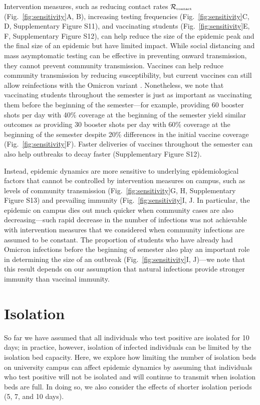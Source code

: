 \documentclass[12pt]{article}
\newcommand{\fref}[1]{Fig.~\ref{fig:#1}}
\newcommand{\Rx}[1]{\ensuremath{{\mathcal R}_{#1}}}
\newcommand{\Rc}{\Rx{\textrm{\tiny{contact}}}}
\begin{document}
Intervention measures, such as reducing contact rates $\Rc$ (\fref{sensitivity}A, B), increasing testing frequencies (\fref{sensitivity}C, D, Supplementary Figure S11), and vaccinating students (\fref{sensitivity}E, F, Supplementary Figure S12), can help reduce the size of the epidemic peak and the final size of an epidemic but have limited impact.
While social distancing and mass asymptomatic testing can be effective in preventing onward transmission, they cannot prevent community transmission.
Vaccines can help reduce community transmission by reducing susceptibility, but current vaccines can still allow reinfections with the Omicron variant \citep{ferguson2021report}.
Nonetheless, we note that vaccinating students throughout the semester is just as important as vaccinating them before the beginning of the semester---for example, providing 60 booster shots per day with 40\% coverage at the beginning of the semester yield similar outcomes as providing 30 booster shots per day with 60\% coverage at the beginning of the semester despite 20\% differences in the initial vaccine coverage (\fref{sensitivity}F).
Faster deliveries of vaccines throughout the semester can also help outbreaks to decay faster (Supplementary Figure S12).

Instead, epidemic dynamics are more sensitive to underlying epidemiological factors that cannot be controlled by intervention measures on campus, such as levels of community transmission (\fref{sensitivity}G, H, Supplementary Figure S13) and prevailing immunity (\fref{sensitivity}I, J.
In particular, the epidemic on campus dies out much quicker when community cases are also decreasing---such rapid decrease in the number of infections was not achievable with intervention measures that we considered when community infections are assumed to be constant.  
The proportion of students who have already had Omicron infections before the beginning of semester also play an important role in determining the size of an outbreak (\fref{sensitivity}I, J)---we note that this result depends on our assumption that natural infections provide stronger immunity than vaccinal immunity.

\section*{Isolation}

So far we have assumed that all individuals who test positive are isolated for 10 days;
in practice, however, isolation of infected individuals can be limited by the isolation bed capacity.
Here, we explore how limiting the number of isolation beds on university campus can affect epidemic dynamics by assuming that individuals who test positive will not be isolated and will continue to transmit when isolation beds are full.
In doing so, we also consider the effects of shorter isolation periods (5, 7, and 10 days).
\end{document}
